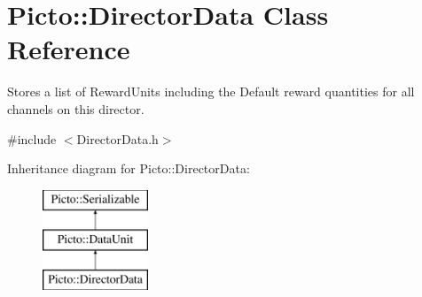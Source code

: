 \hypertarget{class_picto_1_1_director_data}{\section{Picto\-:\-:Director\-Data Class Reference}
\label{class_picto_1_1_director_data}
}


Stores a list of Reward\-Units including the Default reward quantities for all channels on this director.  




{\ttfamily \#include $<$Director\-Data.\-h$>$}

Inheritance diagram for Picto\-:\-:Director\-Data\-:\begin{figure}[H]
\begin{center}
\leavevmode
\includegraphics[height=3.000000cm]{class_picto_1_1_director_data}
\end{center}
\end{figure}
